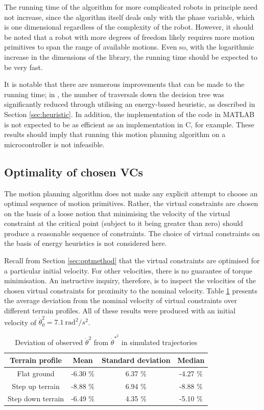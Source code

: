 The running time of the algorithm for more complicated robots in principle need not increase, since the algorithm itself deals only with the phase variable, which is one dimensional regardless of the complexity of the robot. However, it should be noted that a robot with more degrees of freedom likely requires more motion primitives to span the range of available motions. Even so, with the logarithmic increase in the dimensions of the library, the running time should be expected to be very fast.

It is notable that there are numerous improvements that can be made to the running time; in \cite{manchester13planning}, the number of traversals down the decision tree was significantly reduced through utilising an energy-based heuristic, as described in Section \ref{sec:heuristic}. In addition, the implementation of the code in MATLAB is not expected to be as efficient as an implementation in C, for example. These results should imply that running this motion planning algorithm on a microcontroller is not infeasible.

\subsection{Optimality of chosen VCs} \label{sec:resnom}
The motion planning algorithm does not make any explicit attempt to choose an optimal sequence of motion primitives. Rather, the virtual constraints are chosen on the basis of a loose notion that minimising the velocity of the virtual constraint at the critical point (subject to it being greater than zero) should produce a reasonable sequence of constraints. The choice of virtual constraints on the basis of energy heuristics is not considered here.

Recall from Section \ref{sec:optmethod} that the virtual constraints are optimised for a particular initial velocity. For other velocities, there is no guarantee of torque minimisation. An instructive inquiry, therefore, is to inspect the velocities of the chosen virtual constraints for proximity to the nominal velocity. Table \ref{tab:nomvel} presents the average deviation from the nominal velocity of virtual constraints over different terrain profiles. All of these results were produced with an initial velocity of $\dot{\theta}_0^2=7.1~\mathrm{rad}^2/s^2$.

\begin{table}
	\centering
	\begin{tabular}{c | c | c | c }
		Terrain profile & Mean & Standard deviation & Median \\ \hline
		Flat ground & -6.30 \% & 6.37 \% & -4.27 \% \\
		Step up terrain & -8.88 \% & 6.94 \% & -8.88 \% \\
		Step down terrain & -6.49 \% & 4.35 \% & -5.10 \%\\
	\end{tabular}
	\caption{Deviation of observed $\dot{\theta}^2$ from $\dot{\theta}^{*^2}$ in simulated trajectories}
	\label{tab:nomvel}
\end{table}

